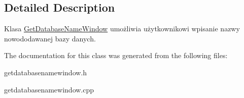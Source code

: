 \subsection{Detailed Description}
Klasa \mbox{\hyperlink{class_get_database_name_window}{Get\+Database\+Name\+Window}} umożliwia użytkownikowi wpisanie nazwy nowododawanej bazy danych. 

The documentation for this class was generated from the following files\+:\begin{DoxyCompactItemize}
\item 
getdatabasenamewindow.\+h\item 
getdatabasenamewindow.\+cpp\end{DoxyCompactItemize}
